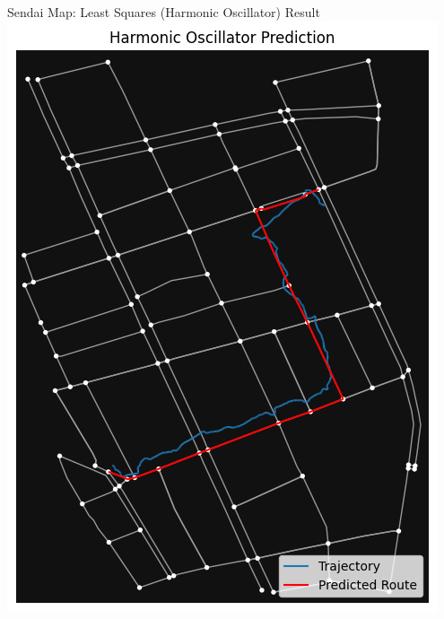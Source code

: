 \documentclass[aspectratio=169, bigfiles]{beamer}
\begin{document}
\begin{frame}{Sendai Map: Least Squares (Harmonic Oscillator) Result}
\centering
\includegraphics[scale=0.21]{Jupyter Notebook LaTeX/leastsquaressendai.png}
    
\end{frame}
\end{document}
